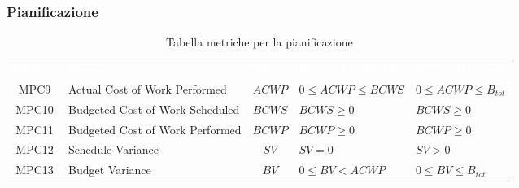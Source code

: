 \subsubsection{Pianificazione}
\renewcommand{\arraystretch}{1.5}
\begin{longtable}{ c C{4cm} c C{3.5cm} C{3.5cm}}
	\caption{Tabella metriche per la pianificazione}\\
	\textcolor{white}{\textbf{Metrica}} & \textcolor{white}{\textbf{Nome}} & \textcolor{white}{\textbf{Sigla}} & \textcolor{white}{\textbf{Range Accettabile}} & \textcolor{white}{\textbf{Range Ottimale}}\\
		MPC9 & Actual Cost of Work Performed & $ACWP$ & $0 \leq ACWP \leq BCWS$ & $0 \leq ACWP \leq B_{tot}$ \\
		MPC10 & Budgeted Cost of Work Scheduled & $BCWS$ & $BCWS \geq 0$ &  $BCWS \geq 0$ \\
		MPC11 & Budgeted Cost of Work Performed & $BCWP$ & $BCWP \geq 0$ & $BCWP \geq 0$ \\
		MPC12 & Schedule Variance & $SV$ & $SV = 0$ & $SV > 0$  \\	
		MPC13 & Budget Variance & $BV$ & $0 \leq BV < ACWP$ & $0 \leq BV \leq B_{tot}$  \\
	\end{longtable}